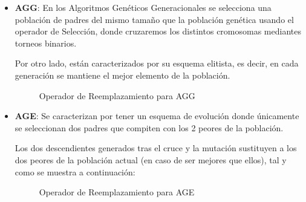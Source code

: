 \begin{itemize}
	\item \textbf{AGG}: En los Algoritmos Genéticos Generacionales se selecciona una población de padres del mismo tamaño que la población genética usando el operador de Selección, donde cruzaremos los distintos cromosomas mediantes torneos binarios.	
	
	
	
	Por otro lado, están caracterizados por su esquema elitista, es decir, en cada generación se mantiene el mejor elemento de la población. 
	
	
	\begin{figure}[H]
		\centering
		\begin{minipage}{.86\linewidth}
			
			
			
			\begin{algorithm}[H] 
				
				\caption{Operador de Reemplazamiento para AGG}
				\SetAlgoLined
				
				
				
			\end{algorithm} 
			
		\end{minipage}
	\end{figure}
	
	
	\item \textbf{AGE}: Se caracterizan por tener un esquema de evolución donde únicamente se seleccionan dos padres que compiten con los 2 peores de la población. 
	
	
	Los dos descendientes generados tras el cruce y la mutación sustituyen a los dos peores de la población actual (en caso de ser mejores que ellos), tal y como se muestra a continuación:
	
	\begin{figure}[H]
		\centering
		\begin{minipage}{.86\linewidth}
			
			
			
			\begin{algorithm}[H] 
				
				\caption{Operador de Reemplazamiento para AGE}
				\SetAlgoLined
				

\end{algorithm}
\end{minipage}
\end{figure}
\end{itemize}
